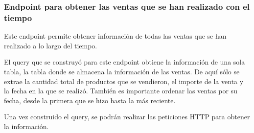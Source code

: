 \subsubsection{Endpoint para obtener las ventas que se han realizado con el tiempo}
Este endpoint permite obtener información de todas las ventas que se han realizado a lo largo del tiempo.

El query que se construyó para este endpoint obtiene la información de una sola tabla, la tabla donde se almacena la información de las ventas. De aquí sólo se extrae la cantidad total de productos que se vendieron, el importe de la venta y la fecha en la que se realizó. También es importante ordenar las ventas por su fecha, desde la primera que se hizo hasta la más reciente.

Una vez construido el query, se podrán realizar las peticiones HTTP para obtener la información.